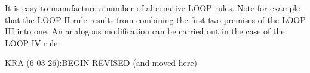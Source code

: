 \documentclass[manuscript, screen, review]{acmart}
\begin{document}

It is easy to manufacture a number of alternative LOOP rules. 
Note for example that the LOOP II rule results from combining the first two
premises of the LOOP III into one.  An analogous modification can be
carried out in the case of the LOOP IV rule. 







KRA (6-03-26):BEGIN REVISED (and moved here)
\end{document}
